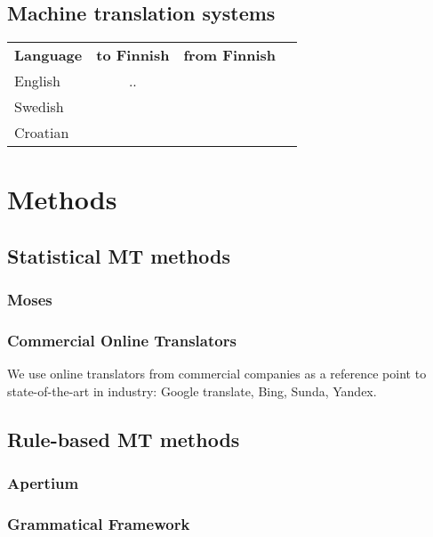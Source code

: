 \documentclass[b5paper]{article}
\begin{document}
\subsection{Machine translation systems}

\begin{table}

\begin{tabular}{lccc}
\hline
\textbf{Language} & \textbf{to Finnish} & \textbf{from Finnish} & \\
English &  ..          &              & \\
Swedish &            &              & \\
Croatian & & & \\
\hline
\end{tabular}
\end{table}


\section{Methods}
\label{sec:methods}

\subsection{Statistical MT methods}

\subsubsection{Moses}

\subsubsection{Commercial Online Translators}

We use online translators from commercial companies as a reference point to state-of-the-art in industry:
Google translate,
Bing,
Sunda,
Yandex.

\subsection{Rule-based MT methods}

\subsubsection{Apertium}

\subsubsection{Grammatical Framework}
\end{document}

